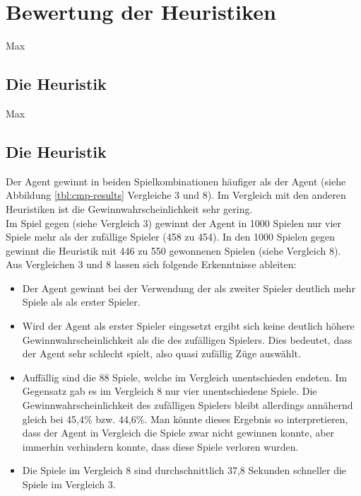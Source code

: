 \section{Bewertung der Heuristiken}
\label{sect:Fazit:Heuristiken}
Max
\subsection{Die Heuristik }
Max
\subsection{Die Heuristik }
\label{fz:h_smc}
Der  Agent gewinnt in beiden Spielkombinationen häufiger als der  Agent (siehe Abbildung \ref{tbl:cmp-results} Vergleiche 3 und 8). Im Vergleich mit den anderen Heuristiken ist die Gewinnwahrscheinlichkeit sehr gering.
\\Im Spiel  gegen  (siehe Vergleich 3) gewinnt der Agent in 1000 Spielen nur vier Spiele mehr als der zufällige Spieler (458 zu 454). In den 1000 Spielen  gegen  gewinnt die Heuristik mit 446 zu 550 gewonnenen Spielen (siehe Vergleich 8).
\\Aus Vergleichen 3 und 8 lassen sich folgende Erkenntnisse ableiten:
\begin{itemize}
\item Der Agent  gewinnt bei der Verwendung der  als zweiter Spieler deutlich mehr Spiele als als erster Spieler.
\item Wird der Agent als erster Spieler eingesetzt ergibt sich keine deutlich höhere Gewinnwahrscheinlichkeit als die des zufälligen Spielers. Dies bedeutet, dass der Agent sehr schlecht spielt, also quasi zufällig Züge auswählt. 
\item Auffällig sind die 88 Spiele, welche im Vergleich unentschieden endeten. Im Gegensatz gab es im Vergleich 8 nur vier unentschiedene Spiele. Die Gewinnwahrscheinlichkeit des zufälligen Spielers bleibt allerdings annähernd gleich bei 45,4\% bzw. 44,6\%. Man könnte dieses Ergebnis so interpretieren, dass der Agent in Vergleich die Spiele zwar nicht gewinnen konnte, aber immerhin verhindern konnte, dass diese Spiele verloren wurden.
\item Die Spiele im Vergleich 8 sind durchschnittlich 37,8 Sekunden schneller die Spiele im Vergleich 3.
\end{itemize}
